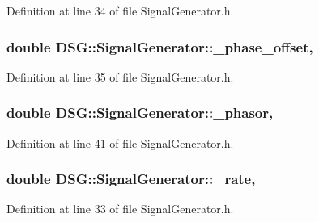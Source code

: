 Definition at line 34 of file Signal\-Generator.\-h.

\hypertarget{classDSG_1_1SignalGenerator_a9abf9d00c798e0fdca6314f17547758a}{
\subsubsection[{\-\_\-phase\-\_\-offset}]{\setlength{\rightskip}{0pt plus 5cm}double D\-S\-G\-::\-Signal\-Generator\-::\-\_\-phase\-\_\-offset\hspace{0.3cm}{\ttfamily [protected]}, {\ttfamily [inherited]}}}\label{classDSG_1_1SignalGenerator_a9abf9d00c798e0fdca6314f17547758a}


Definition at line 35 of file Signal\-Generator.\-h.

\hypertarget{classDSG_1_1SignalGenerator_ac2271b582bf699275f077ecb642a8cd9}{
\subsubsection[{\-\_\-phasor}]{\setlength{\rightskip}{0pt plus 5cm}double D\-S\-G\-::\-Signal\-Generator\-::\-\_\-phasor\hspace{0.3cm}{\ttfamily [protected]}, {\ttfamily [inherited]}}}\label{classDSG_1_1SignalGenerator_ac2271b582bf699275f077ecb642a8cd9}


Definition at line 41 of file Signal\-Generator.\-h.

\hypertarget{classDSG_1_1SignalGenerator_aa10f6c85d9adee901139ea7fb346f39d}{
\subsubsection[{\-\_\-rate}]{\setlength{\rightskip}{0pt plus 5cm}double D\-S\-G\-::\-Signal\-Generator\-::\-\_\-rate\hspace{0.3cm}{\ttfamily [protected]}, {\ttfamily [inherited]}}}\label{classDSG_1_1SignalGenerator_aa10f6c85d9adee901139ea7fb346f39d}


Definition at line 33 of file Signal\-Generator.\-h.

